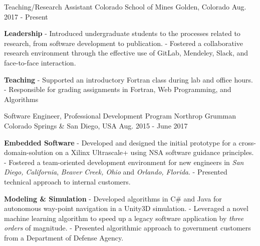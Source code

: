 

\begin{cventries}

  \cventry
    {Teaching/Research Assistant} %
    {Colorado School of Mines} %
    {Golden, Colorado} %
    {Aug. 2017 - Present} %
    {
      \begin{cvitems} %
        \item \textbf{Leadership} 
            \subitem - Introduced undergraduate students to the processes related to research, from software development to publication.
            \subitem - Fostered a collaborative research environment through the effective use of GitLab, Mendeley, Slack, and face-to-face interaction.
        \item \textbf{Teaching}
            \subitem - Supported an introductory Fortran class during lab and office hours.
            \subitem - Responsible for grading assignments in Fortran, Web Programming, and Algorithms
      \end{cvitems}
    }
  \cventry
    {Software Engineer, Professional Development Program}
    {Northrop Grumman}
    {Colorado Springs \& San Diego, USA}
    {Aug. 2015 - June 2017}
    {
      \begin{cvitems}
      \item \textbf{Embedded Software} 
          \subitem - Developed and designed the initial prototype for a cross-domain-solution on a Xilinx Ultrascale+ using NSA software guidance principles. 
          \subitem - Fostered a team-oriented development environment for new engineers in \textit{San Diego, California}, \textit{Beaver Creek, Ohio} and \textit{Orlando, Florida}. 
          \subitem - Presented technical approach to internal customers. 
        \item \textbf{Modeling \& Simulation} 
          \subitem - Developed algorithms in C\# and Java for autonomous way-point navigation in a Unity3D simulation.
          \subitem - Leveraged a novel machine learning algorithm to speed up a legacy software application by \textit{three orders} of magnitude. 
          \subitem- Presented algorithmic approach to government customers from a Department of Defense Agency.
      \end{cvitems}
    }

\end{cventries}

